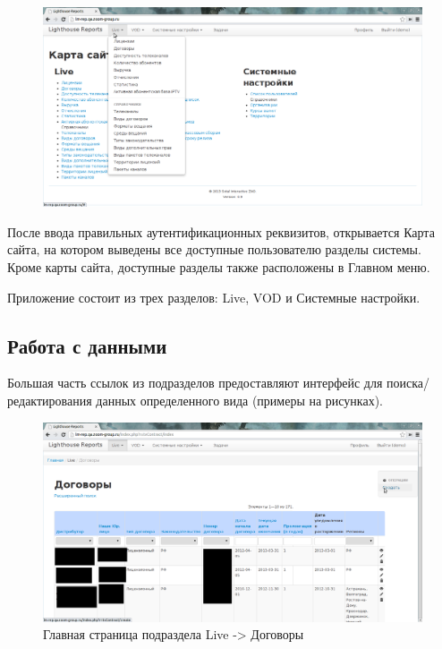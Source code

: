 \begin{figure}[!ht]
\begin{center}
\hspace*{-1cm} \includegraphics[scale=0.28, trim=0mm 0mm 0mm 10mm, clip]{../resources/screens/map.png}
\end{center}
\end{figure}

\vspace*{-1cm} 

После ввода правильных аутентификационных реквизитов, открывается Карта сайта, на котором
выведены все доступные пользователю разделы системы. Кроме карты сайта, доступные разделы
также расположены в Главном меню.

Приложение состоит из трех разделов: Live, VOD и Системные настройки.

\subsection*{Работа с данными}

Большая часть ссылок из подразделов предоставляют интерфейс для поиска/редактирования данных
определенного вида (примеры на рисунках).

\begin{figure}[!ht]
\begin{center}
\hspace*{-1cm} \includegraphics[scale=0.35, trim=0mm 0mm 0mm 10mm, clip]{../resources/screens/contracts.png}
\caption{Главная страница подраздела Live -> Договоры}
\end{center}
\end{figure}

